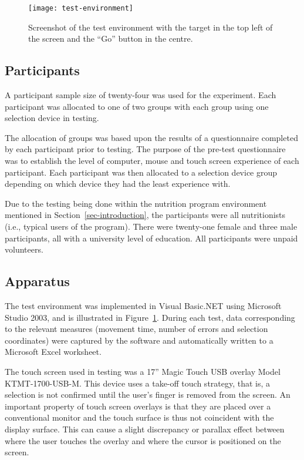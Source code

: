 \documentclass{elsart}
\begin{document}
\begin{figure}
	\centering
 	\texttt{[image: test-environment]}
	\caption{Screenshot of the test environment with the target in the
	top left of the screen and the ``Go'' button in the centre.}
	\label{fig-test-environment}
\end{figure}


\subsection{Participants}
\label{sec-method-participants}

A participant sample size of twenty-four was used for the experiment.
Each participant was allocated to one of two groups with each group
using one selection device in testing.

The allocation of groups was based upon the results of a questionnaire
completed by each participant prior to testing. The purpose of the
pre-test questionnaire was to establish the level of computer, mouse and
touch screen experience of each participant. Each participant was then
allocated to a selection device group depending on which device they had
the least experience with.

Due to the testing being done within the nutrition program environment
mentioned in Section~\ref{sec-introduction}, the participants were all
nutritionists (i.e., typical users of the program). There were
twenty-one female and three male participants, all with a university
level of education. All participants were unpaid volunteers.


\subsection{Apparatus}
\label{sec-method-apparatus}

The test environment was implemented in Visual Basic.NET using Microsoft
Studio 2003, and is illustrated in Figure~\ref{fig-test-environment}.
During each test, data corresponding to the relevant measures (movement
time, number of errors and selection coordinates) were captured by the
software and automatically written to a Microsoft Excel worksheet.

The touch screen used in testing was a 17'' Magic Touch USB overlay
Model KTMT-1700-USB-M. This device uses a take-off touch strategy, that
is, a selection is not confirmed until the user's finger is removed from
the screen. An important property of touch screen overlays is that they
are placed over a conventional monitor and the touch surface is thus not
coincident with the display surface. This can cause a slight discrepancy
or parallax effect between where the user touches the overlay and where
the cursor is positioned on the screen.
\end{document}
